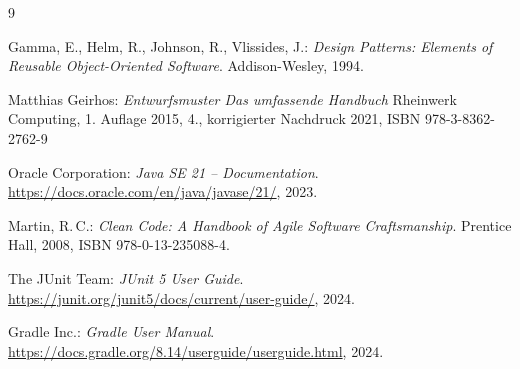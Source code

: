 \newpage
\begin{thebibliography}{9}

Gamma, E., Helm, R., Johnson, R., Vlissides, J.:
\textit{Design Patterns: Elements of Reusable Object-Oriented Software}.
Addison-Wesley, 1994.

Matthias Geirhos:
\textit{Entwurfsmuster Das umfassende Handbuch}
Rheinwerk Computing, 1. Auflage 2015, 4., korrigierter Nachdruck 2021, ISBN 978-3-8362-2762-9

Oracle Corporation:
\textit{Java SE 21 -- Documentation}.
\url{https://docs.oracle.com/en/java/javase/21/}, 2023.

Martin, R.\,C.:
\textit{Clean Code: A Handbook of Agile Software Craftsmanship}.
Prentice Hall, 2008, ISBN 978-0-13-235088-4.

The JUnit Team:
\textit{JUnit 5 User Guide}.
\url{https://junit.org/junit5/docs/current/user-guide/}, 2024.

Gradle Inc.:
\textit{Gradle User Manual}.
\url{https://docs.gradle.org/8.14/userguide/userguide.html}, 2024.

\end{thebibliography}
